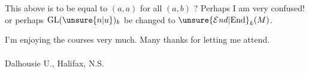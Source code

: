 This above is to be equal to $(a,a)$ for all $(a,b)$ ? Perhaps I am very confused! or perhaps $\mathrm{GL}(\unsure{n|u})_k$  be changed to $\unsure{\mathcal E\mathit{nd}|\mathrm{End}}_k(M)$.

I'm enjoying the courses very much. Many thanks for letting me attend.\\
\hfill{} \\
\hfill Dalhousie U., Halifax, N.S.\\
\clearpage
